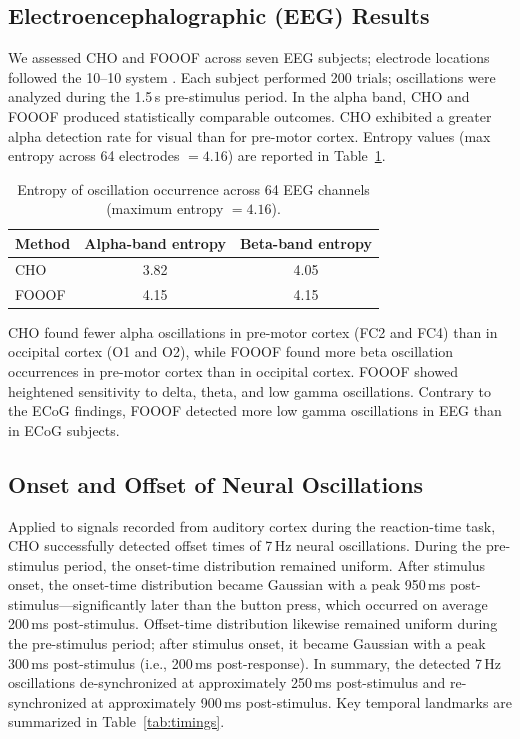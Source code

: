 \documentclass[11pt]{article}
\begin{document}
\subsection{Electroencephalographic (EEG) Results}
We assessed CHO and FOOOF across seven EEG subjects; electrode locations followed the 10--10 system \citep{nuwer2018}. Each subject performed 200 trials; oscillations were analyzed during the 1.5\,s pre-stimulus period. In the alpha band, CHO and FOOOF produced statistically comparable outcomes. CHO exhibited a greater alpha detection rate for visual than for pre-motor cortex. Entropy values (max entropy across 64 electrodes $=4.16$) are reported in Table~\ref{tab:entropy}.

\begin{table}[htbp]
\centering
\caption{Entropy of oscillation occurrence across 64 EEG channels (maximum entropy $=4.16$).}
\label{tab:entropy}
\begin{tabular}{lcc}
\toprule
Method & Alpha-band entropy & Beta-band entropy \\
\midrule
CHO   & 3.82 & 4.05 \\
FOOOF & 4.15 & 4.15 \\
\bottomrule
\end{tabular}
\end{table}

CHO found fewer alpha oscillations in pre-motor cortex (FC2 and FC4) than in occipital cortex (O1 and O2), while FOOOF found more beta oscillation occurrences in pre-motor cortex than in occipital cortex. FOOOF showed heightened sensitivity to delta, theta, and low gamma oscillations. Contrary to the ECoG findings, FOOOF detected more low gamma oscillations in EEG than in ECoG subjects.

\subsection{Onset and Offset of Neural Oscillations}
Applied to signals recorded from auditory cortex during the reaction-time task, CHO successfully detected offset times of 7\,Hz neural oscillations. During the pre-stimulus period, the onset-time distribution remained uniform. After stimulus onset, the onset-time distribution became Gaussian with a peak 950\,ms post-stimulus---significantly later than the button press, which occurred on average 200\,ms post-stimulus. Offset-time distribution likewise remained uniform during the pre-stimulus period; after stimulus onset, it became Gaussian with a peak 300\,ms post-stimulus (i.e., 200\,ms post-response). In summary, the detected 7\,Hz oscillations de-synchronized at approximately 250\,ms post-stimulus and re-synchronized at approximately 900\,ms post-stimulus. Key temporal landmarks are summarized in Table~\ref{tab:timings}.
\end{document}
